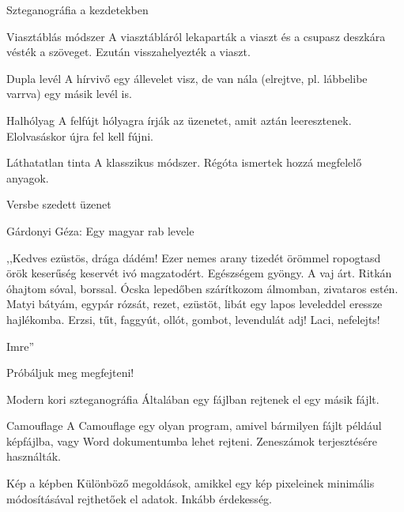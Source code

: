 \documentclass[12 pt]{beamer}
\begin{document}

\begin{frame}{Szteganográfia a kezdetekben}

  \begin{block}{Viasztáblás módszer}
    A viasztábláról lekaparták a viaszt és a csupasz deszkára vésték a szöveget. Ezután visszahelyezték a viaszt.
  \end{block}

  \begin{block}{Dupla levél}
    A hírvivő egy állevelet visz, de van nála (elrejtve, pl. lábbelibe varrva) egy másik levél is.
  \end{block}

  \begin{block}{Halhólyag}
    A felfújt hólyagra írják az üzenetet, amit aztán leeresztenek. Elolvasáskor újra fel kell fújni.
  \end{block}

  \begin{block}{Láthatatlan tinta}
    A klasszikus módszer. Régóta ismertek hozzá megfelelő anyagok.
  \end{block}
  
\end{frame}


\begin{frame}{Versbe szedett üzenet}
  \begin{block}{Gárdonyi Géza: Egy magyar rab levele}

\centering
,,Kedves ezüstös, drága dádém!
Ezer nemes arany tizedét örömmel ropogtasd
örök keserűség keservét ivó magzatodért.
Egészségem gyöngy. A vaj árt. Ritkán óhajtom
sóval, borssal. Ócska lepedőben szárítkozom
álmomban, zivataros estén. Matyi
bátyám, egypár rózsát, rezet, ezüstöt, libát
egy lapos leveleddel eressze hajlékomba.
Erzsi, tűt, faggyút, ollót, gombot, levendulát adj!
Laci, nefelejts!

\qquad

\flushright Imre''
  \end{block}


Próbáljuk meg megfejteni!

\end{frame}


\begin{frame}{Modern kori szteganográfia}
  Általában egy fájlban rejtenek el egy másik fájlt.

  \begin{block}{Camouflage}
    A Camouflage egy olyan program, amivel bármilyen fájlt például képfájlba, vagy Word dokumentumba lehet rejteni. Zeneszámok terjesztésére használták.
  \end{block}

  \begin{block}{Kép a képben}
    Különböző megoldások, amikkel egy kép pixeleinek minimális módosításával rejthetőek el adatok. Inkább érdekesség.
  \end{block}

\end{frame}
\end{document}
